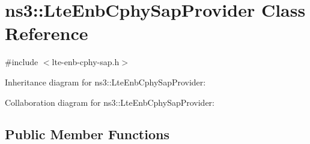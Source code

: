 \hypertarget{classns3_1_1LteEnbCphySapProvider}{}\section{ns3\+:\+:Lte\+Enb\+Cphy\+Sap\+Provider Class Reference}
\label{classns3_1_1LteEnbCphySapProvider}


{\ttfamily \#include $<$lte-\/enb-\/cphy-\/sap.\+h$>$}



Inheritance diagram for ns3\+:\+:Lte\+Enb\+Cphy\+Sap\+Provider\+:


Collaboration diagram for ns3\+:\+:Lte\+Enb\+Cphy\+Sap\+Provider\+:
\subsection*{Public Member Functions}
